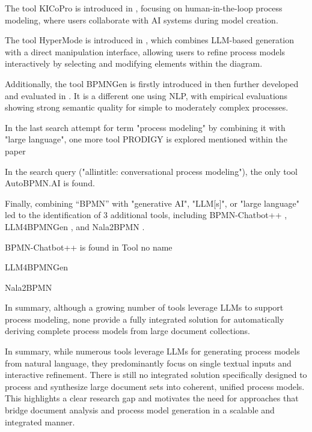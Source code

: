 The tool KICoPro is introduced in \cite{lauer2026human}, focusing on human-in-the-loop process modeling, where users collaborate with AI systems during model creation.

The tool HyperMode is introduced in \cite{pardo2025direct}, which combines LLM-based generation with a direct manipulation interface, allowing users to refine process models interactively by selecting and modifying elements within the diagram.

Additionally, the tool BPMNGen is firstly introduced in \cite{horner2025towards} then further developed and evaluated in \cite{horner2026automatically}. It is a different one using NLP, with empirical evaluations showing strong semantic quality for simple to moderately complex processes.

In the last search attempt for term "process modeling" by combining it with "large language",  one more tool PRODIGY is explored mentioned within the paper \cite{ziche2024llm4pm}

In the search query ("allintitle: conversational process modeling"), the only tool AutoBPMN.AI \cite{klievtsova2025autobpmn} is found. 

Finally, combining “BPMN” with "generative AI", "LLM[s]", or "large language" led to the identification of 3 additional tools, including BPMN-Chatbot++ \cite{safan2025bpmn}, LLM4BPMNGen \cite{costa2025llm4bpmngen}, and Nala2BPMN \cite{nour2024nala2bpmn}.

BPMN-Chatbot++\cite{safan2025bpmn} is found in Tool no name \cite{safan2025framework}

LLM4BPMNGen\cite{costa2025llm4bpmngen} 

Nala2BPMN \cite{nour2024nala2bpmn} 

In summary, although a growing number of tools leverage LLMs to support process modeling, none provide a fully integrated solution for automatically deriving complete process models from large document collections.

In summary, while numerous tools leverage LLMs for generating process models from natural language, they predominantly focus on single textual inputs and interactive refinement. There is still no integrated solution specifically designed to process and synthesize large document sets into coherent, unified process models. This highlights a clear research gap and motivates the need for approaches that bridge document analysis and process model generation in a scalable and integrated manner.

